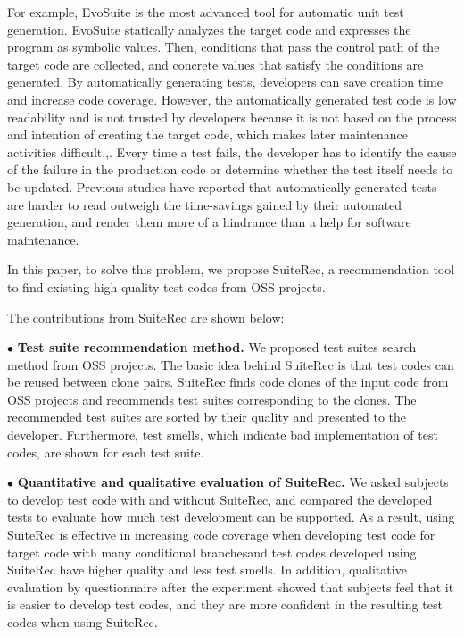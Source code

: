 \documentclass[conference]{IEEEtran}
\begin{document}
For example, EvoSuite\cite{b3} is the most advanced tool for automatic unit test generation. EvoSuite statically analyzes the target code and expresses the program as symbolic values. Then, conditions that pass the control path of the target code are collected, and concrete values that satisfy the conditions are generated. By automatically generating tests, developers can save creation time and increase code coverage. However, the automatically generated test code is low readability and is not trusted by developers because it is not based on the process and intention of creating the target code, which makes later maintenance activities difficult\cite{b13},\cite{b14},\cite{b15}. Every time a test fails, the developer has to identify the cause of the failure in the production code or determine whether the test itself needs to be updated. Previous studies have reported that automatically generated tests are harder to read outweigh the time-savings gained by their automated generation, and render them more of a hindrance than a help for software maintenance\cite{b1}.

In this paper,  to solve this problem, we propose SuiteRec, a recommendation tool to find existing high-quality test codes from OSS projects. 

The contributions from SuiteRec are shown below:

\noindent
$\bullet$ \textbf{Test suite recommendation method.} We proposed test suites search method from OSS projects. The basic idea behind SuiteRec is that test codes can be reused between clone pairs. SuiteRec finds code clones of the input code from OSS projects and recommends test suites corresponding to the clones. The recommended test suites are sorted by their quality and presented to the developer. Furthermore, test smells, which indicate bad implementation of test codes, are shown for each test suite.

\noindent
$\bullet$ \textbf{Quantitative and qualitative evaluation of SuiteRec.} We asked subjects to develop test code with and without SuiteRec, and compared the developed tests to evaluate how much test development can be supported. As a result, using SuiteRec is effective in increasing code coverage when developing test code for target code with many conditional branchesand test codes developed using SuiteRec have higher quality and less test smells. In addition, qualitative evaluation by questionnaire after the experiment showed that subjects feel that it is easier to develop test codes, and they are more confident in the resulting test codes when using SuiteRec.
\end{document}
